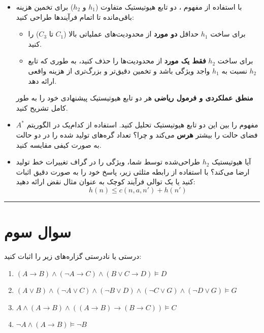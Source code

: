 \documentclass[a4paper,10pt]{article}
\begin{document}
\begin{itemize}
	\item[\textbf{الف)}] 
	با استفاده از مفهوم ، دو تابع هیوتیستیک متفاوت ($h_1$ و $h_2$) برای تخمین هزینه باقی‌مانده تا اتمام فرآیندها طراحی کنید:
	\begin{itemize}
		\item برای ساخت $h_1$ حداقل \textbf{دو مورد} از محدودیت‌های عملیاتی بالا ($C_1$ تا $C_3$) را  کنید.
		\item برای ساخت $h_2$ \textbf{فقط یک مورد} از محدودیت‌ها را حذف کنید، به طوری که تابع $h_2$ نسبت به $h_1$ واجد ویژگی  باشد و تخمین دقیق‌تر و بزرگ‌تری از هزینه واقعی ارائه دهد.
	\end{itemize}
	\textbf{منطق عملکردی و فرمول ریاضی} هر دو تابع هیوتیستیک پیشنهادی خود را به طور کامل تشریح کنید.
	
	\vspace{0.3cm}
	\item[\textbf{ب)}] 
	مفهوم  را بین این دو تابع هیوتیستیک تحلیل کنید. استفاده از کدام‌یک در الگوریتم $A^*$ فضای حالت را بیشتر \textbf{هرس} می‌کند و چرا؟ تعداد گره‌های تولید شده را در دو حالت به صورت کیفی مقایسه کنید.
	
	\vspace{0.3cm}
	\item[\textbf{ج)}] 
	آیا هیوتیستیک $h_2$ طراحی‌شده توسط شما، ویژگی  را در گراف تغییرات خط تولید ارضا می‌کند؟ با استفاده از رابطه مثلثی زیر، پاسخ خود را به صورت دقیق اثبات کنید یا یک توالی فرآیند کوچک به عنوان مثال نقض ارائه دهید:
	$$h(n) \le c(n, a, n') + h(n')$$
	
\end{itemize}
\textcolor{AccentCyan}{\rule{\linewidth}{0.4pt}}
\section{\textcolor{AccentGold}{سوال سوم}}

درستی یا نادرستی گزاره‌های زیر را اثبات کنید:
\begin{latin}
\begin{enumerate}
	\item ${(A \to B) \land (\neg A \to C) \land (B \lor C \to D) \models D}$
	\item ${(A \lor B) \land (\neg A \lor C) \land (\neg B \lor D) \land (\neg C \lor G) \land (\neg D \lor G) \models G}$
	\item ${A \land (A \to B) \land ((A \to B) \to (B \to C)) \models C}$
	\item ${\neg A \land (A \to B) \models \neg B}$
\end{enumerate}
\end{latin}
\end{document}
